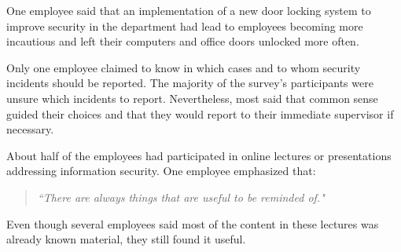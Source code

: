One employee said that an implementation of a new door locking system to improve security in the department had lead to employees becoming more incautious and left their computers and office doors unlocked more often.

Only one employee claimed to know in which cases and to whom security incidents should be reported. The majority of the survey's participants were unsure which incidents to report. Nevertheless, most said that common sense guided their choices and that they would report to their immediate supervisor if necessary.

About half of the employees had participated in online lectures or presentations addressing information security. One employee emphasized that:

\begin{quote}
\textit{``There are always things that are useful to be reminded of."}
\end{quote}

Even though several employees said most of the content in these lectures was already known material, they still found it useful.